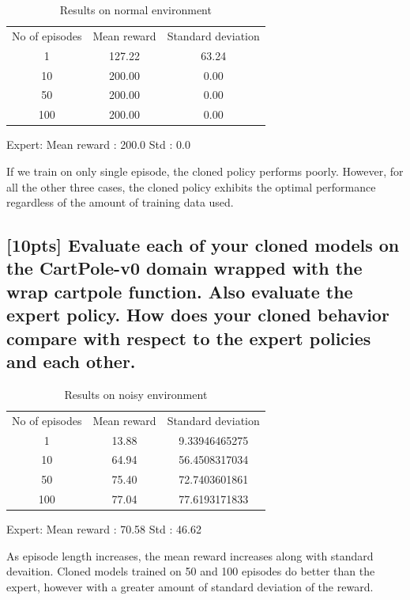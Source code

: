 \documentclass{article}
\begin{document}
\begin{table}[H]
\centering
\caption{Results on normal environment}
\label{my-label}
\begin{tabular}{ccc}
No of episodes & Mean reward & Standard deviation \\
1              & 127.22       & 63.24    \\
10            & 200.00       & 0.00      \\
50            & 200.00       & 0.00    \\
100          & 200.00       & 0.00     
\end{tabular}
\end{table}

Expert:
Mean reward : 200.0
Std : 0.0

If we train on only single episode, the cloned policy performs poorly. However, for all the other three cases, the cloned policy exhibits the optimal performance regardless of the amount of training data used. 

\subsection{[10pts] Evaluate each of your cloned models on the CartPole-v0 domain wrapped with the wrap cartpole function. Also evaluate the expert policy. How does your cloned behavior compare with respect to the expert policies and each other.}

\begin{table}[H]
\centering
\caption{Results on noisy environment}
\label{my-label}
\begin{tabular}{ccc}
No of episodes & Mean reward & Standard deviation \\
1            & 13.88       & 9.33946465275      \\
10           & 64.94       & 56.4508317034      \\
50           & 75.40       & 72.7403601861      \\
100          & 77.04       & 77.6193171833      
\end{tabular}
\end{table}

Expert:
Mean reward : 70.58
Std : 46.62

As episode length increases, the mean reward increases along with standard devaition. 
Cloned models trained on 50 and 100 episodes do better than the expert, however with a greater amount of standard deviation of the reward. 
\end{document}

